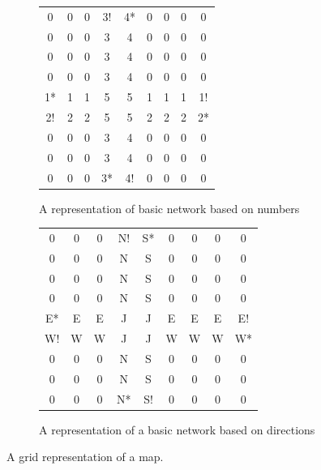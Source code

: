 \documentclass{article}
\begin{document}
\begin{figure}
\centering
\begin{subfigure}{0.45\textwidth}
\centering

\begin{tabular}{ccccccccc}
0 & 0 & 0 & 3! & 4* & 0 & 0 & 0 & 0 \\
0 & 0 & 0 & 3 & 4 & 0 & 0 & 0 & 0\\
0 & 0 & 0 & 3 & 4 & 0 & 0 & 0 & 0 \\
0 & 0 & 0 & 3 & 4 & 0 & 0 & 0 & 0\\
1* & 1 & 1 & 5 & 5 & 1 & 1 & 1 & 1!\\
2! & 2 & 2 & 5 & 5 & 2 & 2 & 2 & 2*\\
0 & 0 & 0 & 3 & 4 & 0 & 0 & 0 & 0\\
0 & 0 & 0 & 3 & 4 & 0 & 0 & 0 & 0\\
0 & 0 & 0 & 3* & 4! & 0 & 0 & 0 & 0\\
\end{tabular} 
\caption{A representation of basic network based on numbers}
\label{NumberRepresentation}
\end{subfigure}
%
\qquad
\begin{subfigure}{0.45\textwidth}
\centering
\begin{tabular}{ccccccccc}
0 & 0 & 0 & N! & S* & 0 & 0 & 0 & 0 \\
0 & 0 & 0 & N & S & 0 & 0 & 0 & 0\\
0 & 0 & 0 & N & S & 0 & 0 & 0 & 0 \\
0 & 0 & 0 & N & S & 0 & 0 & 0 & 0\\
E* & E & E & J & J & E & E & E & E!\\
W! & W & W & J & J & W & W & W & W*\\
0 & 0 & 0 & N & S & 0 & 0 & 0 & 0\\
0 & 0 & 0 & N & S & 0 & 0 & 0 & 0\\
0 & 0 & 0 & N* & S! & 0 & 0 & 0 & 0\\
\end{tabular} 
\caption{A representation of a basic network based on directions}
\label{DirectionRepresentation}
\end{subfigure}
\caption{A grid representation of a map.}
\label{ExampleNet}
\end{figure}
\end{document}
